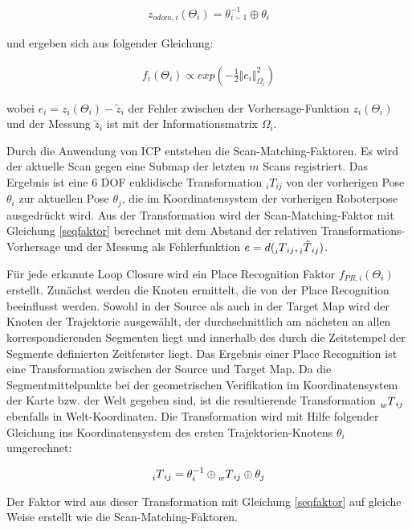 \begin{align}
	z_{odom,i}(\Theta_i) = \theta_{i-1}^{-1}\oplus \theta_i
\end{align}

und ergeben sich aus folgender Gleichung:

\begin{align}
	\label{seqfaktor}
	f_i(\Theta_i) \propto exp(-\frac{1}{2} \Vert e_i\Vert_{\Omega_i}^2)
\end{align}

wobei $ e_i = z_i(\Theta_i) - \tilde{z}_i $ der Fehler zwischen der Vorhersage-Funktion $ z_i(\Theta_i) $ und der Messung $ \tilde{z}_i $ ist mit der Informationsmatrix $ \Omega_i $.

Durch die Anwendung von ICP entstehen die Scan-Matching-Faktoren. Es wird der aktuelle Scan gegen eine Submap der letzten $ m $ Scans registriert. Das Ergebnis ist eine 6 DOF euklidische Transformation $ _iT_{ij} $ von der vorherigen Pose $ \theta_i $ zur aktuellen Pose $ \theta_j $, die im Koordinatensystem der vorherigen Roboterpose ausgedrückt wird. Aus der Transformation wird der Scan-Matching-Faktor mit Gleichung \ref{seqfaktor} berechnet mit dem Abstand der relativen Transformations-Vorhersage und der Messung als Fehlerfunktion $ e = d(\prescript{}{i}{T}_{ij}, \prescript{}{i}{\tilde{T}}_{ij}) $.

Für jede erkannte Loop Closure wird ein Place Recognition Faktor $ f_{PR,i}(\Theta_i) $ erstellt. Zunächst werden die Knoten ermittelt, die von der Place Recognition beeinflusst werden. Sowohl in der Source als auch in der Target Map wird der Knoten der Trajektorie ausgewählt, der durchschnittlich am nächsten an allen korrespondierenden Segmenten liegt und innerhalb des durch die Zeitstempel der Segmente definierten Zeitfenster liegt. Das Ergebnis einer Place Recognition ist eine Transformation zwischen der Source und Target Map. Da die Segmentmittelpunkte bei der geometrischen Verifikation im Koordinatensystem der Karte bzw. der Welt gegeben sind, ist die resultierende Transformation $ \prescript{}{w}{T}_{ij} $ ebenfalls in Welt-Koordinaten. Die Transformation wird mit Hilfe folgender Gleichung ins Koordinatensystem des ersten Trajektorien-Knotens $ \theta_i $ umgerechnet: 

\begin{align}
	\prescript{}{i}{T}_{ij} = \theta_i^{-1}\oplus \prescript{}{w}{T}_{ij}\oplus \theta_j
\end{align}

Der Faktor wird aus dieser Transformation mit Gleichung \ref{seqfaktor} auf gleiche Weise erstellt wie die Scan-Matching-Faktoren. 

